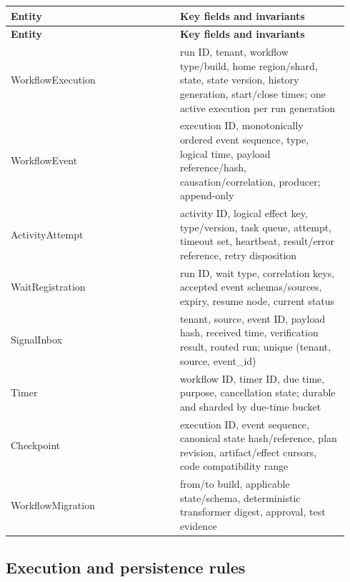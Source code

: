 \BookTableStart
\small
\begin{longtable}{@{}Y{0.4700\linewidth}Y{0.4700\linewidth}@{}}
\color{white}\bfseries \textbf{Entity} & \color{white}\bfseries \textbf{Key fields and invariants} \\
\endfirsthead
{}
\color{white}\bfseries \textbf{Entity} & \color{white}\bfseries \textbf{Key fields and invariants} \\
\endhead
WorkflowExecution & run ID, tenant, workflow type/build, home region/shard, state, state version, history generation, start/close times; one active execution per run generation \\
WorkflowEvent & execution ID, monotonically ordered event sequence, type, logical time, payload reference/hash, causation/correlation, producer; append-only \\
ActivityAttempt & activity ID, logical effect key, type/version, task queue, attempt, timeout set, heartbeat, result/error reference, retry disposition \\
WaitRegistration & run ID, wait type, correlation keys, accepted event schemas/sources, expiry, resume node, current status \\
SignalInbox & tenant, source, event ID, payload hash, received time, verification result, routed run; unique (tenant, source, event\_id) \\
Timer & workflow ID, timer ID, due time, purpose, cancellation state; durable and sharded by due-time bucket \\
Checkpoint & execution ID, event sequence, canonical state hash/reference, plan revision, artifact/effect cursors, code compatibility range \\
WorkflowMigration & from/to build, applicable state/schema, deterministic transformer digest, approval, test evidence \\
\end{longtable}
\BookTableEnd

\subsection{Execution and persistence rules}

